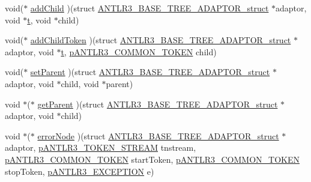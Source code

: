 \begin{DoxyCompactItemize}
\item 
void($\ast$ \hyperlink{struct_a_n_t_l_r3___b_a_s_e___t_r_e_e___a_d_a_p_t_o_r__struct_ae04a60c7a36f1cddb51a243c19bbb71a}{add\-Child} )(struct \hyperlink{struct_a_n_t_l_r3___b_a_s_e___t_r_e_e___a_d_a_p_t_o_r__struct}{A\-N\-T\-L\-R3\-\_\-\-B\-A\-S\-E\-\_\-\-T\-R\-E\-E\-\_\-\-A\-D\-A\-P\-T\-O\-R\-\_\-struct} $\ast$adaptor, void $\ast$\hyperlink{showimage_8m_ad941f6ef920fbfb3d75b60ddbedbdd39}{t}, void $\ast$child)
\item 
void($\ast$ \hyperlink{struct_a_n_t_l_r3___b_a_s_e___t_r_e_e___a_d_a_p_t_o_r__struct_a0baae1cea0bbdd8ee2909d3e91ab544a}{add\-Child\-Token} )(struct \hyperlink{struct_a_n_t_l_r3___b_a_s_e___t_r_e_e___a_d_a_p_t_o_r__struct}{A\-N\-T\-L\-R3\-\_\-\-B\-A\-S\-E\-\_\-\-T\-R\-E\-E\-\_\-\-A\-D\-A\-P\-T\-O\-R\-\_\-struct} $\ast$adaptor, void $\ast$\hyperlink{showimage_8m_ad941f6ef920fbfb3d75b60ddbedbdd39}{t}, \hyperlink{antlr3interfaces_8h_adaa6df9cbf0cd7ab37fd545520ff299b}{p\-A\-N\-T\-L\-R3\-\_\-\-C\-O\-M\-M\-O\-N\-\_\-\-T\-O\-K\-E\-N} child)
\item 
void($\ast$ \hyperlink{struct_a_n_t_l_r3___b_a_s_e___t_r_e_e___a_d_a_p_t_o_r__struct_af1fea85350899dcfb722478d6de30379}{set\-Parent} )(struct \hyperlink{struct_a_n_t_l_r3___b_a_s_e___t_r_e_e___a_d_a_p_t_o_r__struct}{A\-N\-T\-L\-R3\-\_\-\-B\-A\-S\-E\-\_\-\-T\-R\-E\-E\-\_\-\-A\-D\-A\-P\-T\-O\-R\-\_\-struct} $\ast$adaptor, void $\ast$child, void $\ast$parent)
\item 
void $\ast$($\ast$ \hyperlink{struct_a_n_t_l_r3___b_a_s_e___t_r_e_e___a_d_a_p_t_o_r__struct_ad32fd347e4e421aefab6f1bec530b6e6}{get\-Parent} )(struct \hyperlink{struct_a_n_t_l_r3___b_a_s_e___t_r_e_e___a_d_a_p_t_o_r__struct}{A\-N\-T\-L\-R3\-\_\-\-B\-A\-S\-E\-\_\-\-T\-R\-E\-E\-\_\-\-A\-D\-A\-P\-T\-O\-R\-\_\-struct} $\ast$adaptor, void $\ast$child)
\item 
void $\ast$($\ast$ \hyperlink{struct_a_n_t_l_r3___b_a_s_e___t_r_e_e___a_d_a_p_t_o_r__struct_a1cd062dd808190f6b220a08678e89391}{error\-Node} )(struct \hyperlink{struct_a_n_t_l_r3___b_a_s_e___t_r_e_e___a_d_a_p_t_o_r__struct}{A\-N\-T\-L\-R3\-\_\-\-B\-A\-S\-E\-\_\-\-T\-R\-E\-E\-\_\-\-A\-D\-A\-P\-T\-O\-R\-\_\-struct} $\ast$adaptor, \hyperlink{antlr3interfaces_8h_a9daa2d452cf7fb0c1f4b5e153266070c}{p\-A\-N\-T\-L\-R3\-\_\-\-T\-O\-K\-E\-N\-\_\-\-S\-T\-R\-E\-A\-M} tnstream, \hyperlink{antlr3interfaces_8h_adaa6df9cbf0cd7ab37fd545520ff299b}{p\-A\-N\-T\-L\-R3\-\_\-\-C\-O\-M\-M\-O\-N\-\_\-\-T\-O\-K\-E\-N} start\-Token, \hyperlink{antlr3interfaces_8h_adaa6df9cbf0cd7ab37fd545520ff299b}{p\-A\-N\-T\-L\-R3\-\_\-\-C\-O\-M\-M\-O\-N\-\_\-\-T\-O\-K\-E\-N} stop\-Token, \hyperlink{antlr3interfaces_8h_a71e034bba80bdc564fd0c8d62f2962b5}{p\-A\-N\-T\-L\-R3\-\_\-\-E\-X\-C\-E\-P\-T\-I\-O\-N} e)

\end{DoxyCompactItemize}
